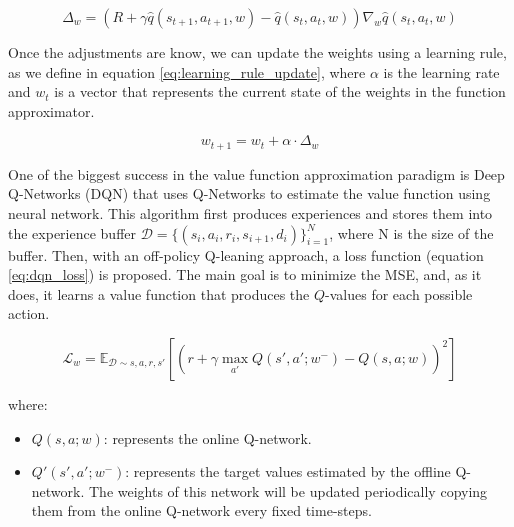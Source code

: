 
\begin{equation} \label{eq:value_approx_td0}
	\Delta_{w} = (R + \gamma \hat{q}(s_{t+1},a_{t+1},w) - \hat{q}(s_{t},a_{t},w)) \nabla_{w}\hat{q}(s_{t},a_{t},w)
\end{equation}

Once the adjustments are know, we can update the weights using a learning rule, as we define in equation \ref{eq:learning_rule_update}, where $\alpha$ is the learning rate and $w_t$ is a vector that represents the current state of the weights in the function approximator.

\begin{equation}
	\label{eq:learning_rule_update}
	w_{t+1} = w_{t} + \alpha \cdot \Delta_{w}
\end{equation}

%

One of the biggest success in the value function approximation paradigm is Deep Q-Networks (DQN) \cite{mnih2013playing} that uses Q-Networks to estimate the value function using neural network. This algorithm first produces experiences and stores them into the experience buffer $\mathcal{D} = \{(s_i, a_i, r_i, s_{i+1}, d_i)\}_{i=1}^N$, where N is the size of the buffer. Then, with an off-policy Q-leaning approach, a loss function (equation \ref{eq:dqn_loss}) is proposed. The main goal is to minimize the MSE, and, as it does, it learns a value function that produces the ${Q}$-values for each possible action.

\begin{equation} \label{eq:dqn_loss}
	\mathcal{L}_w = \mathbb{E}_{\mathcal{D} \sim s, a, r, s'} \left[ \left( r + \gamma \max_{a'} Q(s', a'; w^-) - Q(s, a; w) \right)^2 \right]
\end{equation}

\noindent where:
\begin{itemize}
	\item $Q(s, a; w)$: represents the online Q-network.
	\item $Q'(s', a'; w^-)$: represents the target values estimated by the offline Q-network. The weights of this network will be updated periodically copying them from the online Q-network every fixed time-steps.
\end{itemize}

